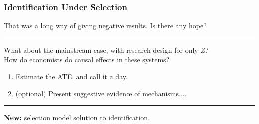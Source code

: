 \documentclass[dvipsnames]{beamer} %
\begin{document}
\begin{frame}[noframenumbering]
    \frametitle{Identification Under Selection}
    That was a long way of giving negative results.
    Is there any hope?
    \par\noindent\rule{\textwidth}{0.4pt}
    \vskip0.25cm
    What about the mainstream case, with research design for only $Z$?\\
    How do economists do causal effects in these systems?
    \begin{enumerate}
        \item Estimate the ATE, and call it a day.
        \item (optional) Present suggestive evidence of mechanisms$\hdots$.
        \hyperlink{suggestive-evidence}{}
    \end{enumerate}
    \vskip0.5cm
    \par\noindent\rule{\textwidth}{0.4pt}
    \vfill
    \textbf{New:} selection model solution to identification.
\end{frame}
\end{document}
